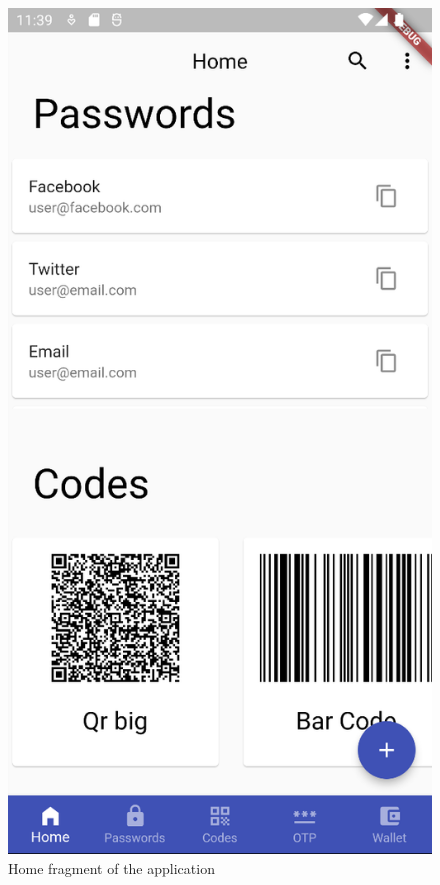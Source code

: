 \documentclass[a4paper,12pt]{report}
\begin{document}
\begin{figure}[H]
    \centering
    \includegraphics[scale=0.45]{images/app/home.png}
    \caption{Home fragment of the application}\label{fig:homepage}
\end{figure}
\end{document}

